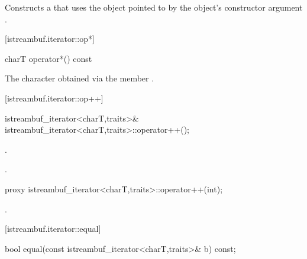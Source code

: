 \begin{itemdescr}
\pnum
\effects
Constructs a
that uses the
object pointed to by the
object's constructor argument .
\end{itemdescr}

[istreambuf.iterator::op*]{}

%
\begin{itemdecl}
charT operator*() const
\end{itemdecl}

\begin{itemdescr}
\pnum
\returns
The character obtained via the
member
.
\end{itemdescr}

[istreambuf.iterator::op++]{}

%
\begin{itemdecl}
istreambuf_iterator<charT,traits>&
    istreambuf_iterator<charT,traits>::operator++();
\end{itemdecl}

\begin{itemdescr}
\pnum
\effects
{}.

\pnum
\returns
{}.
\end{itemdescr}

%
%
\begin{itemdecl}
proxy istreambuf_iterator<charT,traits>::operator++(int);
\end{itemdecl}

\begin{itemdescr}
\pnum
\returns
{}.
\end{itemdescr}

[istreambuf.iterator::equal]{}

%
\begin{itemdecl}
bool equal(const istreambuf_iterator<charT,traits>& b) const;
\end{itemdecl}

